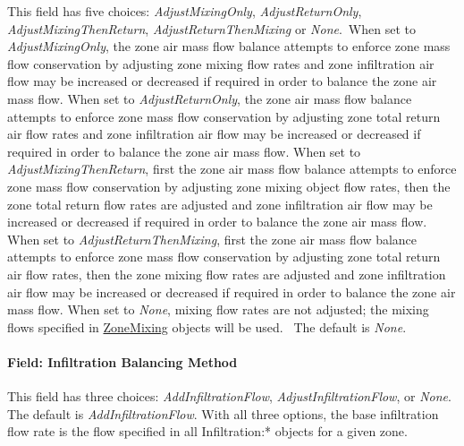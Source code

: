 This field has five choices: \emph{AdjustMixingOnly}, \emph{AdjustReturnOnly}, \emph{AdjustMixingThenReturn}, \emph{AdjustReturnThenMixing} or \emph{None}.~When set to \emph{AdjustMixingOnly}, the zone air mass flow balance attempts to enforce zone mass flow conservation by adjusting zone mixing flow rates and zone infiltration air flow may be increased or decreased if required in order to balance the zone air mass flow. When set to \emph{AdjustReturnOnly}, the zone air mass flow balance attempts to enforce zone mass flow conservation by adjusting zone total return air flow rates and zone infiltration air flow may be increased or decreased if required in order to balance the zone air mass flow. When set to \emph{AdjustMixingThenReturn}, first the zone air mass flow balance attempts to enforce zone mass flow conservation by adjusting zone mixing object flow rates, then the zone total return flow rates are adjusted and zone infiltration air flow may be increased or decreased if required in order to balance the zone air mass flow. When set to \emph{AdjustReturnThenMixing}, first the zone air mass flow balance attempts to enforce zone mass flow conservation by adjusting zone total return air flow rates, then the zone mixing flow rates are adjusted and zone infiltration air flow may be increased or decreased if required in order to balance the zone air mass flow. When set to \emph{None}, mixing flow rates are not adjusted; the mixing flows specified in \hyperref[zonemixing]{ZoneMixing} objects will be used.~ The default is \emph{None}.

\paragraph{Field: Infiltration Balancing Method}\label{field-infiltration-balancing-method}

This field has three choices: \emph{AddInfiltrationFlow}, \emph{AdjustInfiltrationFlow}, or \emph{None}. The default is \emph{AddInfiltrationFlow}. With all three options, the base infiltration flow rate is the flow specified in all Infiltration:* objects for a given zone.

